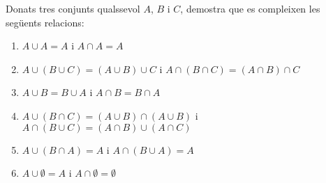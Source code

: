 \begin{exer}
Donats tres conjunts qualssevol $A$, $B$ i $C$, demostra que es compleixen
les seg\"{u}ents relacions:

\begin{enumerate}
\item $A\cup A=A$ i $A\cap A=A$

\item $A\cup (B\cup C)=(A\cup B)\cup C$ i $A\cap (B\cap C)=(A\cap B)\cap C$

\item $A\cup B=B\cup A$ i $A\cap B=B\cap A$

\item $A\cup (B\cap C)=(A\cup B)\cap (A\cup B)$ i $A\cap (B\cup C)=(A\cap
B)\cup (A\cap C)$

\item $A\cup (B\cap A)=A$ i $A\cap (B\cup A)=A$

\item $A\cup \emptyset =A$ i $A\cap \emptyset =\emptyset $
\end{enumerate}
\end{exer}

